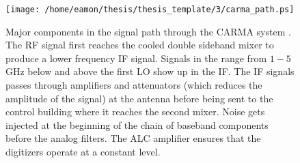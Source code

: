 \begin{figure}[!ht]
\centering 
          \texttt{[image: /home/eamon/thesis/thesis\_template/3/carma\_path.ps]}
\caption[Major components in the signal path for CARMA.]{Major components in the signal path through the CARMA system \citep{wei_2008}. The RF signal first reaches the cooled double sideband mixer to produce a lower frequency IF signal.	Signals in the range from $1-5$\,GHz below and above the first LO show up in the IF. The IF signals passes through amplifiers and attenuators (which reduces the amplitude of the signal) at the antenna before being sent to the control building where it reaches the second mixer. Noise gets injected at the beginning of the chain of baseband components before the analog filters. The ALC amplifier ensures that the digitizers operate at a constant level.}
\label{fig3.4}
\end{figure}

